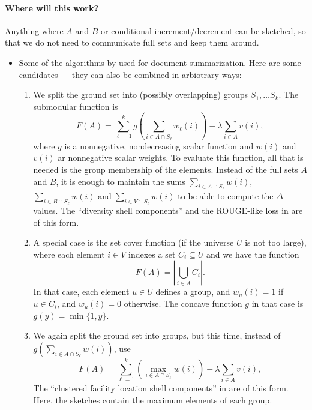 \documentclass{article}
\newcommand{\inter}{\cap}
\begin{document}
\paragraph{Where will this work?} Anything where $A$ and $B$ or conditional increment/decrement can be sketched, so that we do not need to communicate full sets and keep them around.
\begin{itemize}
\item Some of the algorithms by \citet{linB12learning} used for document summarization.
  Here are some candidates --- they can also be combined in arbiotrary ways:
  \begin{enumerate}
  \item We split the ground set into (possibly overlapping) groups $S_1, \ldots S_k$. The submodular function is
    \begin{equation}
      \label{eq:2}
      F(A) = \sum_{\ell=1}^k g\left(\sum_{i \in A \inter S_\ell} w_\ell(i)\right) - \lambda \sum_{i \in A}v(i),
    \end{equation}
    where $g$ is a nonnegative, nondecreasing scalar function and $w(i)$ and $v(i)$ ar nonnegative scalar weights.
    To evaluate this function, all that is needed is the group membership of the elements. Instead of the full sets $A$ and $B$, it is enough to maintain the sums $\sum_{i \in A \inter S_\ell} w(i)$, $\sum_{i \in B \inter S_\ell} w(i)$ and $\sum_{i \in V \inter S_\ell} w(i)$ to be able to compute the $\Delta$ values.
  The ``diversity shell components'' and the ROUGE-like loss in \citep{linB12learning} are of this form.
\item A special case is the set cover function (if the universe $U$ is not too large), where
  each element $i \in V$ indexes a set $C_i \subseteq U$ and we have the function
  \begin{equation}
    F(A) = |\bigcup_{i \in A}C_i|.
  \end{equation}
  In that case, each element $u \in U$ defines a group, and $w_u(i) = 1$ if $u \in C_i$, and $w_u(i) = 0$ otherwise. The concave function $g$ in that case is $g(y) = \min\{1,y\}$.
\item We again split the ground set into groups, but this time, instead of $g(\sum_{i \in A \inter S_\ell} w(i))$, use
   \begin{equation}
      \label{eq:3}
      F(A) = \sum_{\ell=1}^k (\max_{i \in A \inter S_\ell} w(i)) - \lambda \sum_{i \in A}v(i),
    \end{equation}
    The ``clustered facility location shell components'' in \citep{linB12learning} are of this form.   Here, the sketches contain the maximum elements of each group.

\end{enumerate}
\end{itemize}
\end{document}
